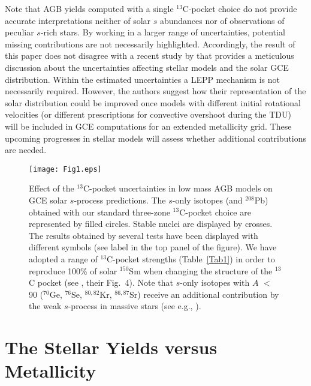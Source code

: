 \documentclass[manuscript]{aastex}
\begin{document}
Note that AGB yields computed with a single $^{13}$C-pocket choice do not provide accurate 
 interpretations 
neither of solar $s$ abundances nor of observations of peculiar $s$-rich stars.
By working in a larger range of uncertainties, potential missing contributions are not 
necessarily highlighted.
Accordingly, the result of this paper does not disagree with a recent study by \citet{cristallo15} 
that provides a meticulous discussion about the uncertainties affecting stellar models and
the solar GCE distribution.
Within the estimated uncertainties a LEPP mechanism is not necessarily required.
However, the authors suggest how their representation of the solar distribution could be 
improved once models with different initial rotational velocities (or different 
prescriptions for convective overshoot during the TDU) 
will be included in GCE computations
for an extended metallicity grid.
These upcoming progresses in stellar models will assess whether additional 
contributions are needed.




\begin{figure} 
\center
\texttt{[image: Fig1.eps]}
\caption{\label{Fig1}
Effect of the $^{13}$C-pocket uncertainties in low mass AGB models on GCE solar $s$-process 
predictions. The $s$-only isotopes (and $^{208}$Pb) obtained with our standard three-zone 
$^{13}$C-pocket choice are represented by filled circles. 
Stable nuclei are displayed by crosses.
The results obtained by several tests have been displayed with different symbols
(see label in the top panel of the figure). 
We have adopted a range of $^{13}$C-pocket strengths (Table~\ref{Tab1})
in order to reproduce 100\% of solar $^{150}$Sm when 
changing the structure of the $^{13}$C pocket (see \citealt{bisterzo14}, their Fig.~4).
Note that $s$-only isotopes with $A$ $<$ 90 ($^{70}$Ge, $^{76}$Se, $^{80,82}$Kr, 
$^{86,87}$Sr) receive an additional contribution by the weak $s$-process in
massive stars (see e.g., \citealt{pignatari10}). }
\end{figure}





\section{The Stellar Yields versus Metallicity}\label{yields}
\end{document}
